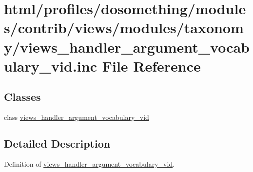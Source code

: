 \hypertarget{views__handler__argument__vocabulary__vid_8inc}{
\section{html/profiles/dosomething/modules/contrib/views/modules/taxonomy/views\_\-handler\_\-argument\_\-vocabulary\_\-vid.inc File Reference}
\label{views__handler__argument__vocabulary__vid_8inc}
}
\subsection*{Classes}
\begin{DoxyCompactItemize}
\item 
class \hyperlink{classviews__handler__argument__vocabulary__vid}{views\_\-handler\_\-argument\_\-vocabulary\_\-vid}
\end{DoxyCompactItemize}


\subsection{Detailed Description}
Definition of \hyperlink{classviews__handler__argument__vocabulary__vid}{views\_\-handler\_\-argument\_\-vocabulary\_\-vid}. 